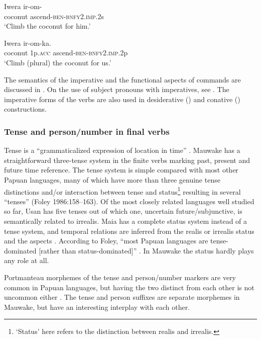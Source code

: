 \ea%
\label{ex:3:x232}
\gll Iwera ir-om- \\
coconut ascend-\textsc{ben}-\textsc{bnfy}2.\textsc{imp}.2s \\
\glt`Climb the coconut for him.'
\z

\ea%
\label{ex:3:x233}
\gll Iwera  ir-om-ka. \\
coconut 1p.\textsc{acc} ascend-\textsc{ben}-\textsc{bnfy}2.\textsc{imp}.2p \\
\glt`Climb (plural) the coconut for us.'
\z

The semantics of the imperative and the functional aspects of commands are discussed in . On the use of subject pronouns with imperatives, see . The imperative forms of the verbs are also used in desiderative () and conative () constructions. 

\subsubsection{Tense and person/number in final verbs}\label{sec:3.8.3.4}
{}
Tense is a ``{grammaticalized expression of location in time}'' \citep[9]{Comrie1985}. Mauwake has a straightforward three-tense system in the finite verbs marking past, present and future time reference. The tense system is simple compared with most other Papuan languages, many of which have more than three genuine tense distinctions and/or interaction between tense and status\footnote{`Status' here refers to the distinction between realis and irrealis.} resulting in several ``tenses'' ({Foley 1986}:158--163). Of the most closely related languages well studied so far, Usan has five tenses \citep[98]{Reesink1987} out of which one, uncertain future/subjunctive, is semantically related to irrealis. Maia has a complete status system instead of a tense system, and temporal relations are inferred from the realis or irrealis status and the aspects \citep[55]{Hardin2002}. According to {Foley}, {``most Papuan languages are tense-dominated [rather than status-dominated]''} \citeyear[162]{Foley1986}. In Mauwake the status hardly plays any role at all.

Portmanteau morphemes of the tense and person/number markers are very common in Papuan languages, but having the two distinct from each other is not uncommon either \citep[137]{Foley1986}. The tense and person suffixes are separate morphemes in Mauwake, but have an interesting interplay with each other.

